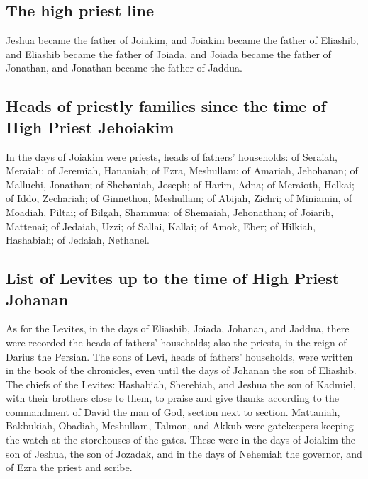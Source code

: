 \begin{paracol}{2}
\begin{otherlanguage}{english}
\hypertarget{the-high-priest-line}{%
\subsection{The high priest line}\label{the-high-priest-line}}

 Jeshua became the father of Joiakim, and Joiakim became
the father of Eliashib, and Eliashib became the father of Joiada,
 and Joiada became the father of Jonathan, and Jonathan
became the father of Jaddua.

\hypertarget{heads-of-priestly-families-since-the-time-of-high-priest-jehoiakim}{%
\subsection{Heads of priestly families since the time of High Priest
Jehoiakim}\label{heads-of-priestly-families-since-the-time-of-high-priest-jehoiakim}}

 In the days of Joiakim were priests, heads of fathers'
households: of Seraiah, Meraiah; of Jeremiah, Hananiah; 
of Ezra, Meshullam; of Amariah, Jehohanan;  of Malluchi,
Jonathan; of Shebaniah, Joseph;  of Harim, Adna; of
Meraioth, Helkai;  of Iddo, Zechariah; of Ginnethon,
Meshullam;  of Abijah, Zichri; of Miniamin, of Moadiah,
Piltai;  of Bilgah, Shammua; of Shemaiah, Jehonathan;
 of Joiarib, Mattenai; of Jedaiah, Uzzi; 
of Sallai, Kallai; of Amok, Eber;  of Hilkiah, Hashabiah;
of Jedaiah, Nethanel.

\hypertarget{list-of-levites-up-to-the-time-of-high-priest-johanan}{%
\subsection{List of Levites up to the time of High Priest
Johanan}\label{list-of-levites-up-to-the-time-of-high-priest-johanan}}

 As for the Levites, in the days of Eliashib, Joiada,
Johanan, and Jaddua, there were recorded the heads of fathers'
households; also the priests, in the reign of Darius the Persian.
 The sons of Levi, heads of fathers' households, were
written in the book of the chronicles, even until the days of Johanan
the son of Eliashib.  The chiefs of the Levites:
Hashabiah, Sherebiah, and Jeshua the son of Kadmiel, with their brothers
close to them, to praise and give thanks according to the commandment of
David the man of God, section next to section. 
Mattaniah, Bakbukiah, Obadiah, Meshullam, Talmon, and Akkub were
gatekeepers keeping the watch at the storehouses of the gates.
 These were in the days of Joiakim the son of Jeshua, the
son of Jozadak, and in the days of Nehemiah the governor, and of Ezra
the priest and scribe.


\end{otherlanguage}
\end{paracol}
